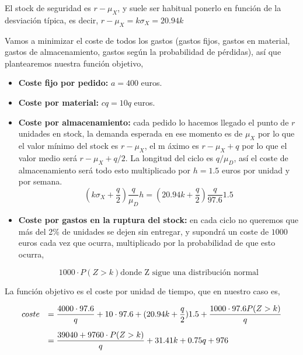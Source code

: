 \documentclass[a4paper,12pt]{article}
\begin{document}
El stock de seguridad es $r - \mu_X$, y suele ser habitual ponerlo en funci\'on de la desviaci\'on t\'ipica, es decir, $r - \mu_X = k\sigma_X = 20.94k$

Vamos a minimizar el coste de todos los gastos (gastos fijos, gastos en material, gastos de almacenamiento, gastos según la probabilidad de pérdidas), as\'i que plantearemos nuestra funci\'on objetivo,

\begin{itemize}
\item[] \textbf{Coste fijo por pedido:} $a = 400$ euros.
\item[] \textbf{Coste por material:} $cq = 10q$ euros.
\item[] \textbf{Coste por almacenamiento:} cada pedido lo hacemos llegado el punto de $r$ unidades en stock, la demanda esperada en ese momento es de $\mu_X$ por lo que el valor m\'inimo del stock es $r - \mu_X$, el m \'aximo es $r - \mu_X + q$ por lo que el valor medio ser\'a $r - \mu_X + q/2$. La longitud del ciclo es $q/\mu_D$, as\'i el coste de almacenamiento ser\'a todo esto multiplicado por $h = 1.5$ euros por unidad y por semana.
$$ (k\sigma_X + \dfrac{q}{2})\dfrac{q}{\mu_D} h = (20.94k + \dfrac{q}{2})\dfrac{q}{97.6} 1.5$$

\item[] \textbf{Coste por gastos en la ruptura del stock:} en cada ciclo no queremos que m\'as del 2\% de unidades se dejen sin entregar, y supondr\'a un coste de $1000$ euros cada vez que ocurra, multiplicado por la probabilidad de que esto ocurra,

$$ 1000\cdot P(Z > k)\text{donde Z sigue una distribuci\'on normal}$$
\end{itemize}

La funci\'on objetivo es el coste por unidad de tiempo, que en nuestro caso es,

\begin{equation*}
\begin{array}{l l}
coste & = \dfrac{4000\cdot 97.6}{q} + 10\cdot 97.6 + (20.94k + \dfrac{q}{2}) 1.5 + \dfrac{1000\cdot 97.6 P(Z > k)}{q}\\[.5cm]
\, & = \dfrac{39040 + 9760\cdot P(Z > k)}{q} + 31.41k + 0.75q + 976

\end{array}
\end{equation*}

\end{document}
